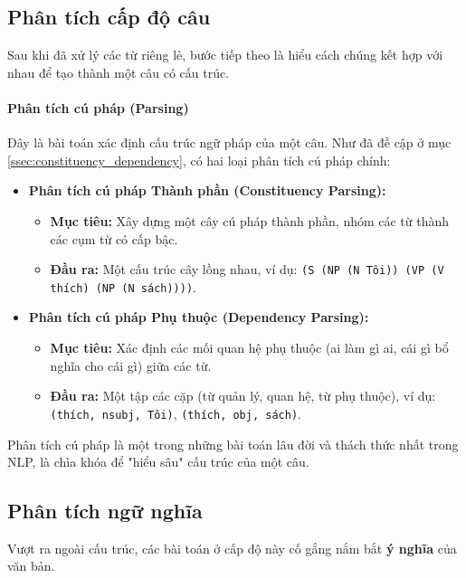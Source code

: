 \subsection{Phân tích cấp độ câu}
\label{ssec:phan_tich_cau}

Sau khi đã xử lý các từ riêng lẻ, bước tiếp theo là hiểu cách chúng kết hợp với nhau để tạo thành một câu có cấu trúc.

\paragraph{Phân tích cú pháp (Parsing)}
Đây là bài toán xác định cấu trúc ngữ pháp của một câu. Như đã đề cập ở mục \ref{ssec:constituency_dependency}, có hai loại phân tích cú pháp chính:
\begin{itemize}
    \item \textbf{Phân tích cú pháp Thành phần (Constituency Parsing):}
        \begin{itemize}
            \item \textbf{Mục tiêu:} Xây dựng một cây cú pháp thành phần, nhóm các từ thành các cụm từ có cấp bậc.
            \item \textbf{Đầu ra:} Một cấu trúc cây lồng nhau, ví dụ: \texttt{(S (NP (N Tôi)) (VP (V thích) (NP (N sách))))}.
        \end{itemize}
    \item \textbf{Phân tích cú pháp Phụ thuộc (Dependency Parsing):}
        \begin{itemize}
            \item \textbf{Mục tiêu:} Xác định các mối quan hệ phụ thuộc (ai làm gì ai, cái gì bổ nghĩa cho cái gì) giữa các từ.
            \item \textbf{Đầu ra:} Một tập các cặp (từ quản lý, quan hệ, từ phụ thuộc), ví dụ: \texttt{(thích, nsubj, Tôi)}, \texttt{(thích, obj, sách)}.
        \end{itemize}
\end{itemize}
Phân tích cú pháp là một trong những bài toán lâu đời và thách thức nhất trong NLP, là chìa khóa để "hiểu sâu" cấu trúc của một câu.

\subsection{Phân tích ngữ nghĩa}
\label{ssec:phan_tich_ngu_nghia}

Vượt ra ngoài cấu trúc, các bài toán ở cấp độ này cố gắng nắm bắt \textbf{ý nghĩa} của văn bản.

